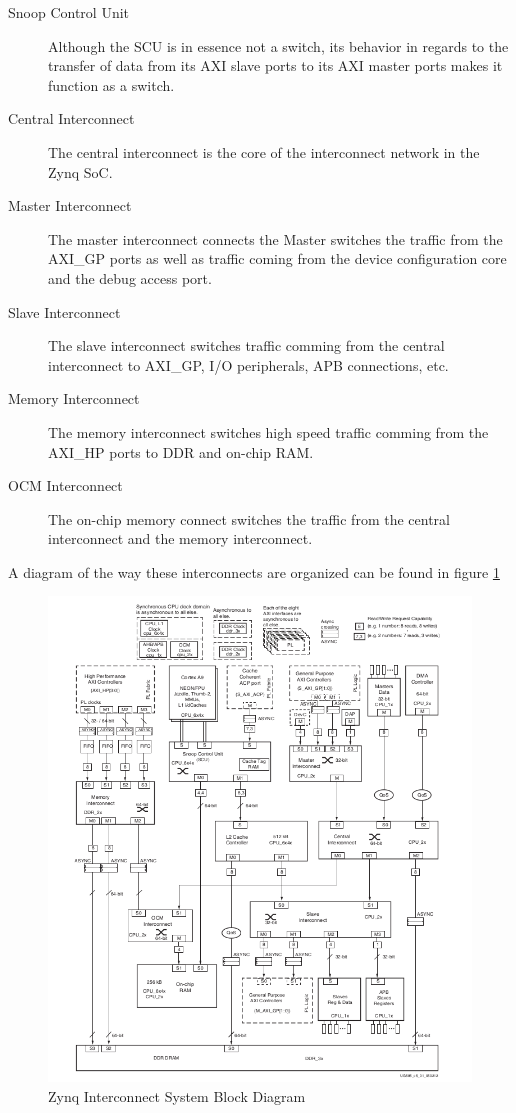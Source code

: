 		\begin{description}
			\item[Snoop Control Unit] Although the SCU is in essence not a switch, its behavior in regards to the transfer of data from its AXI slave ports to its AXI master ports makes it function as a switch.
			\item[Central Interconnect] The central interconnect is the core of the interconnect network in the Zynq SoC.\
			\item[Master Interconnect] The master interconnect connects the Master switches the traffic from the AXI\_GP ports as well as traffic coming from the device configuration core and the debug access port.
			\item[Slave Interconnect] The slave interconnect switches traffic comming from the central interconnect to AXI\_GP, I/O peripherals, APB connections, etc.
			\item[Memory Interconnect] The memory interconnect switches high speed traffic comming from the AXI\_HP ports to DDR and on-chip RAM.
			\item[OCM Interconnect] The on-chip memory connect switches the traffic from the central interconnect and the memory interconnect.
		\end{description}

		A diagram of the way these interconnects are organized can be found in figure \ref{img:zynq_intereconnect}

\begin{figure}[H]
\centering
\includegraphics[scale=0.55]{./images/interconnect_block_diagram.png}
\caption{Zynq Interconnect System Block Diagram \cite{anon._zynq-7000_2013}}
\label{img:zynq_intereconnect}
\end{figure}

